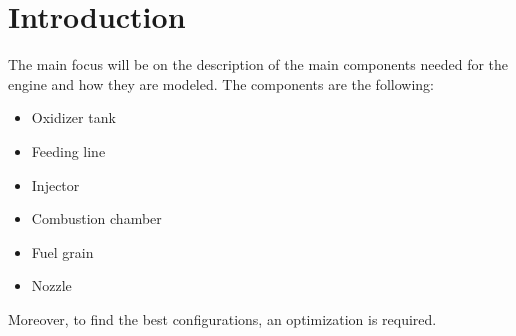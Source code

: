 \documentclass[a4paper,12pt]{report}
\begin{document}
\renewcommand{\contentsname}{Index}
\tableofcontents %

\chapter{Introduction}
The main focus will be on the description of the main components needed for the engine and how they are modeled. The components are the following:
\begin{itemize}
    \item Oxidizer tank
    \item Feeding line
    \item Injector
    \item Combustion chamber
    \item Fuel grain
    \item Nozzle
\end{itemize}
Moreover, to find the best configurations, an optimization  is required.
\newpage












\end{document}
